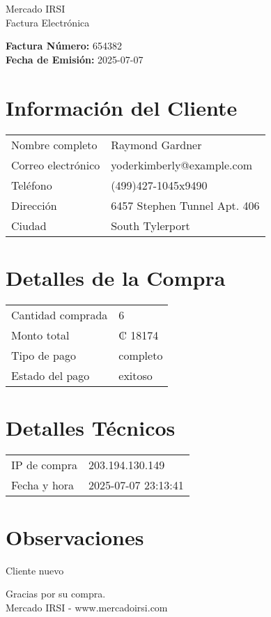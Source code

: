 \documentclass[12pt]{article}
\begin{document}
\begin{center}
    \Huge Mercado IRSI \\
    \Large Factura Electrónica
\end{center}

\vspace{0.5cm}

\noindent \textbf{Factura Número:} 654382 \\
\textbf{Fecha de Emisión:} 2025-07-07

\vspace{0.5cm}

\section*{Información del Cliente}
\begin{longtable}{ll}
Nombre completo & Raymond Gardner \\
Correo electrónico & yoderkimberly@example.com \\
Teléfono & (499)427-1045x9490 \\
Dirección & 6457 Stephen Tunnel Apt. 406 \\
Ciudad & South Tylerport \\
\end{longtable}

\vspace{0.5cm}

\section*{Detalles de la Compra}
\begin{longtable}{ll}
Cantidad comprada & 6 \\
Monto total & ₡ 18174 \\
Tipo de pago & completo \\
Estado del pago & exitoso \\
\end{longtable}

\vspace{0.5cm}

\section*{Detalles Técnicos}
\begin{longtable}{ll}
IP de compra & 203.194.130.149 \\
Fecha y hora & 2025-07-07 23:13:41 \\
\end{longtable}

\vspace{0.5cm}

\section*{Observaciones}
Cliente nuevo

\vspace{0.5cm}

\begin{center}
    Gracias por su compra. \\
    Mercado IRSI - www.mercadoirsi.com
\end{center}
\end{document}
